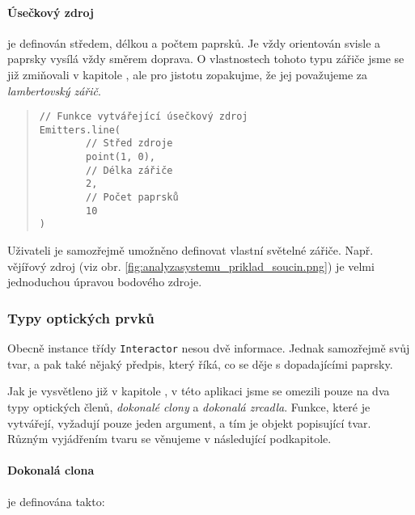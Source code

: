 
\paragraph{Úsečkový zdroj} je definován středem, délkou a počtem paprsků. Je vždy orientován svisle a paprsky vysílá vždy směrem doprava. O vlastnostech tohoto typu zářiče jsme se již zmiňovali v kapitole , ale pro jistotu zopakujme, že jej považujeme za \emph{lambertovský zářič}.\src

\begin{minipage}{\textwidth}\begin{quote}\begin{lstlisting}
// Funkce vytvářející úsečkový zdroj
Emitters.line(
        // Střed zdroje
        point(1, 0),
        // Délka zářiče
        2,
        // Počet paprsků
        10
)
\end{lstlisting}\end{quote}\end{minipage}


Uživateli je samozřejmě umožněno definovat vlastní světelné zářiče. Např. vějířový zdroj (viz obr. \ref{fig:analyzasystemu_priklad_soucin.png}) je velmi jednoduchou úpravou bodového zdroje.


\subsubsection{Typy optických prvků}

Obecně instance třídy \texttt{Interactor} nesou dvě informace. Jednak samozřejmě svůj tvar, a pak také nějaký předpis, který říká, co se děje s dopadajícími paprsky.

Jak je vysvětleno již v kapitole , v této aplikaci jsme se omezili pouze na dva typy optických členů, \emph{dokonalé clony} a \emph{dokonalá zrcadla}. Funkce, které je vytvářejí, vyžadují pouze jeden argument, a tím je objekt popisující tvar. Různým vyjádřením tvaru se věnujeme v následující podkapitole.

\paragraph{Dokonalá clona} je definována takto:

